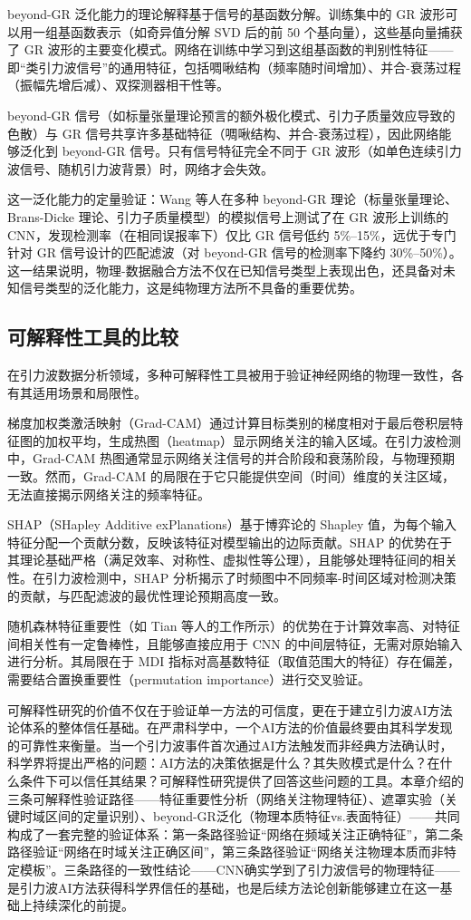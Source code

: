 beyond-GR 泛化能力的理论解释基于信号的基函数分解。训练集中的 GR 波形可以用一组基函数表示（如奇异值分解 SVD 后的前 50 个基向量），这些基向量捕获了 GR 波形的主要变化模式。网络在训练中学习到这组基函数的判别性特征——即“类引力波信号”的通用特征，包括啁啾结构（频率随时间增加）、并合-衰荡过程（振幅先增后减）、双探测器相干性等。

beyond-GR 信号（如标量张量理论预言的额外极化模式、引力子质量效应导致的色散）与 GR 信号共享许多基础特征（啁啾结构、并合-衰荡过程），因此网络能够泛化到 beyond-GR 信号。只有信号特征完全不同于 GR 波形（如单色连续引力波信号、随机引力波背景）时，网络才会失效。

这一泛化能力的定量验证：Wang 等人在多种 beyond-GR 理论（标量张量理论、Brans-Dicke 理论、引力子质量模型）的模拟信号上测试了在 GR 波形上训练的 CNN，发现检测率（在相同误报率下）仅比 GR 信号低约 5\%--15\%，远优于专门针对 GR 信号设计的匹配滤波（对 beyond-GR 信号的检测率下降约 30\%--50\%）。这一结果说明，物理-数据融合方法不仅在已知信号类型上表现出色，还具备对未知信号类型的泛化能力，这是纯物理方法所不具备的重要优势。

\subsection{可解释性工具的比较}

在引力波数据分析领域，多种可解释性工具被用于验证神经网络的物理一致性，各有其适用场景和局限性。

梯度加权类激活映射（Grad-CAM）通过计算目标类别的梯度相对于最后卷积层特征图的加权平均，生成热图（heatmap）显示网络关注的输入区域。在引力波检测中，Grad-CAM 热图通常显示网络关注信号的并合阶段和衰荡阶段，与物理预期一致。然而，Grad-CAM 的局限在于它只能提供空间（时间）维度的关注区域，无法直接揭示网络关注的频率特征。

SHAP（SHapley Additive exPlanations）基于博弈论的 Shapley 值，为每个输入特征分配一个贡献分数，反映该特征对模型输出的边际贡献。SHAP 的优势在于其理论基础严格（满足效率、对称性、虚拟性等公理），且能够处理特征间的相关性。在引力波检测中，SHAP 分析揭示了时频图中不同频率-时间区域对检测决策的贡献，与匹配滤波的最优性理论预期高度一致。

随机森林特征重要性（如 Tian 等人的工作所示）的优势在于计算效率高、对特征间相关性有一定鲁棒性，且能够直接应用于 CNN 的中间层特征，无需对原始输入进行分析。其局限在于 MDI 指标对高基数特征（取值范围大的特征）存在偏差，需要结合置换重要性（permutation importance）进行交叉验证。

可解释性研究的价值不仅在于验证单一方法的可信度，更在于建立引力波AI方法论体系的整体信任基础。在严肃科学中，一个AI方法的价值最终要由其科学发现的可靠性来衡量。当一个引力波事件首次通过AI方法触发而非经典方法确认时，科学界将提出严格的问题：AI方法的决策依据是什么？其失败模式是什么？在什么条件下可以信任其结果？可解释性研究提供了回答这些问题的工具。本章介绍的三条可解释性验证路径——特征重要性分析（网络关注物理特征）、遮罩实验（关键时域区间的定量识别）、beyond-GR泛化（物理本质特征vs.表面特征）——共同构成了一套完整的验证体系：第一条路径验证“网络在频域关注正确特征”，第二条路径验证“网络在时域关注正确区间”，第三条路径验证“网络关注物理本质而非特定模板”。三条路径的一致性结论——CNN确实学到了引力波信号的物理特征——是引力波AI方法获得科学界信任的基础，也是后续方法论创新能够建立在这一基础上持续深化的前提。

